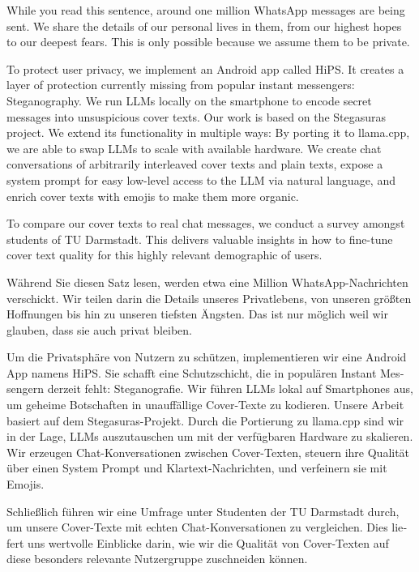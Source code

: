 
\begingroup
\let\clearpage\relax
\let\cleardoublepage\relax
\let\cleardoublepage\relax

While you read this sentence, around one million WhatsApp messages are being sent. We share the details of our personal lives in them, from our highest hopes to our deepest fears. This is only possible because we assume them to be private.

To protect user privacy, we implement an Android app called \gls{HiPS}. It creates a layer of protection currently missing from popular instant messengers: Steganography. We run \glspl{LLM} locally on the smartphone to encode secret messages into unsuspicious cover texts. Our work is based on the Stegasuras project. We extend its functionality in multiple ways: By porting it to llama.cpp, we are able to swap \glspl{LLM} to scale with available hardware. We create chat conversations of arbitrarily interleaved cover texts and plain texts, expose a system prompt for easy low-level access to the \gls{LLM} via natural language, and enrich cover texts with emojis to make them more organic.

To compare our cover texts to real chat messages, we conduct a survey amongst students of TU Darmstadt. This delivers valuable insights in how to fine-tune cover text quality for this highly relevant demographic of users.

\vfill

\begin{otherlanguage}{ngerman}
Während Sie diesen Satz lesen, werden etwa eine Million WhatsApp-Nachrichten verschickt. Wir teilen darin die Details unseres Privatlebens, von unseren größten Hoffnungen bis hin zu unseren tiefsten Ängsten. Das ist nur möglich weil wir glauben, dass sie auch privat bleiben.

Um die Privatsphäre von Nutzern zu schützen, implementieren wir eine Android App namens \gls{HiPS}. Sie schafft eine Schutzschicht, die in populären Instant Messengern derzeit fehlt: Steganografie. Wir führen \glspl{LLM} lokal auf Smartphones aus, um geheime Botschaften in unauffällige Cover-Texte zu kodieren. Unsere Arbeit basiert auf dem Stegasuras-Projekt. Durch die Portierung zu llama.cpp sind wir in der Lage, \glspl{LLM} auszutauschen um mit der verfügbaren Hardware zu skalieren. Wir erzeugen Chat-Konversationen zwischen Cover-Texten, steuern ihre Qualität über einen System Prompt und Klartext-Nachrichten, und verfeinern sie mit Emojis.

Schließlich führen wir eine Umfrage unter Studenten der TU Darmstadt durch, um unsere Cover-Texte mit echten Chat-Konversationen zu vergleichen. Dies liefert uns wertvolle Einblicke darin, wie wir die Qualität von Cover-Texten auf diese besonders relevante Nutzergruppe zuschneiden können.
\end{otherlanguage}

\endgroup

\vfill
